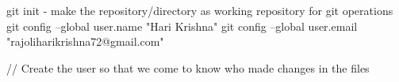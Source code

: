 git init - make the repository/directory as working repository for git operations
 git config --global user.name "Hari Krishna"
 git config --global user.email "rajoliharikrishna72@gmail.com"

// Create the user so that we come to know who made changes in the files